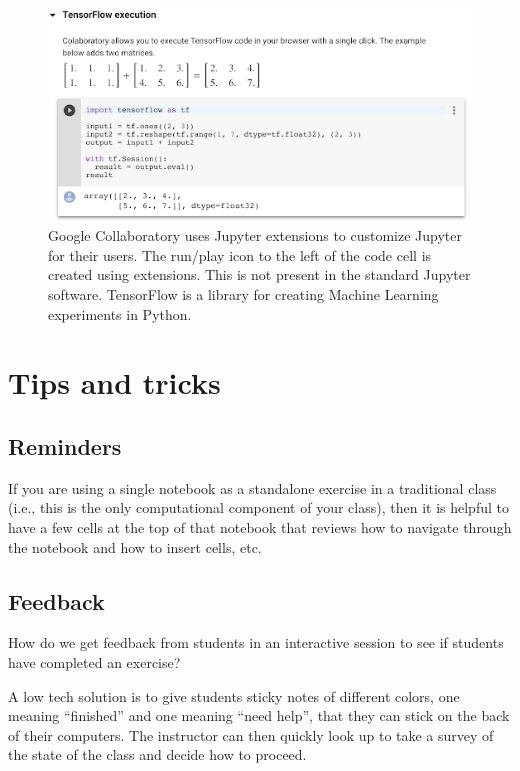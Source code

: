 \documentclass[]{book}
\begin{document}
\begin{figure}
\centering
\includegraphics{images/chapter53.png}
\caption{Google Collaboratory uses Jupyter extensions to customize
Jupyter for their users. The run/play icon to the left of the code cell
is created using extensions. This is not present in the standard Jupyter
software. TensorFlow is a library for creating Machine Learning
experiments in Python.}
\end{figure}

\section{Tips and tricks}\label{tips-and-tricks}

\subsection{Reminders}\label{reminders}

If you are using a single notebook as a standalone exercise in a
traditional class (i.e., this is the only computational component of
your class), then it is helpful to have a few cells at the top of that
notebook that reviews how to navigate through the notebook and how to
insert cells, etc.

\subsection{Feedback}\label{feedback}

How do we get feedback from students in an interactive session to see if
students have completed an exercise?

A low tech solution is to give students sticky notes of different
colors, one meaning ``finished'' and one meaning ``need help'', that
they can stick on the back of their computers. The instructor can then
quickly look up to take a survey of the state of the class and decide
how to proceed.
\end{document}
